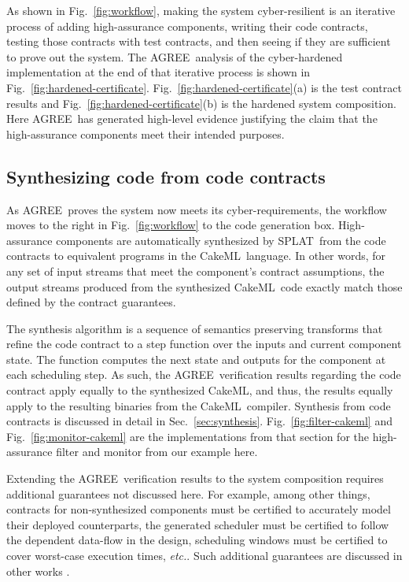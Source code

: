 \documentclass[global,twocolumn]{svjour}
\newcommand{\figref}[1]{Fig.~\ref{#1}}
\newcommand{\secref}[1]{Sec.~\ref{#1}}
\newcommand{\agr}{AGREE}
\newcommand{\splt}{SPLAT}
\newcommand{\ckml}{CakeML}
\newcommand{\etc}{\textit{etc.}}
\begin{document}
As shown in \figref{fig:workflow}, making the system cyber-resilient is an iterative process of adding high-assurance components, writing their code contracts, testing those contracts with test contracts, and then seeing if they are sufficient to prove out the system.
%
The \agr\ analysis of the cyber-hardened implementation at the end of that iterative process is shown in \figref{fig:hardened-certificate}.
%
\figref{fig:hardened-certificate}(a) is the test contract results and \figref{fig:hardened-certificate}(b) is the hardened system composition.
%
Here \agr\ has generated high-level evidence justifying the claim that the high-assurance components meet their intended purposes.

%
\subsection{Synthesizing code from code contracts}

As \agr\ proves the system now meets its cyber-requirements, the workflow moves to the right in \figref{fig:workflow} to the code generation box.
%
High-assurance components are automatically synthesized by \splt\ from the code contracts to equivalent programs in the \ckml\ language.
%
In other words, for any set of input streams that meet the component's contract assumptions, the output streams produced from the synthesized \ckml\ code exactly match those defined by the contract guarantees.

The synthesis algorithm is a sequence of semantics preserving transforms that refine the code contract to a step function over the inputs and current component state. The function computes the next state and outputs for the component at each scheduling step.
%
As such, the \agr\ verification results regarding the code contract apply equally to the synthesized \ckml, and thus, the results equally apply to the resulting binaries from the \ckml\ compiler.
%
Synthesis from code contracts is discussed in detail in \secref{sec:synthesis}.
%
\figref{fig:filter-cakeml} and \figref{fig:monitor-cakeml} are the implementations from that section for the high-assurance filter and monitor from our example here.


Extending the \agr\ verification results to the system composition requires additional guarantees not discussed here.
%
For example, among other things, contracts for non-synthesized components must be certified to accurately model their deployed counterparts, the generated scheduler must be certified to follow the dependent data-flow in the design, scheduling windows must be certified to cover worst-case execution times, \etc.
%
Such additional guarantees are discussed in other works \cite{gearcase2020, dcrypps2019, 10.1007/978-3-030-89159-6_18, 10.1007/978-3-030-89159-6_17, sel4-2009, nfm:agree, 9734792}.
\end{document}

